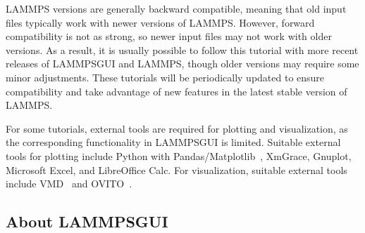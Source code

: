 \documentclass[9pt,tutorial]{livecoms}
\newcommand{\lammpsgui}{\textsf{LAMMPS\textendash GUI}}
\begin{document}
LAMMPS versions are generally backward compatible, meaning that old
input files typically work with newer versions of LAMMPS.  However,
forward compatibility is not as strong, so
newer input files may not work with older versions.  As a result, it is
usually possible to follow this tutorial with more recent releases of
\lammpsgui{} and LAMMPS, though older versions may require some minor adjustments.
These tutorials will be periodically updated to ensure compatibility
and take advantage of new features in the latest stable version of LAMMPS.

For some tutorials, external tools are required for plotting and
visualization, as the corresponding functionality in \lammpsgui{} is
limited.  Suitable external tools for plotting include Python with
Pandas/Matplotlib~\cite{van1995python,hunter2007Matplotlib}, XmGrace,
Gnuplot, Microsoft Excel, and LibreOffice Calc.  For visualization,
suitable external tools include VMD~\cite{vmd_home,humphrey1996vmd}
and OVITO~\cite{ovito_home,ovito_paper}.

\subsection{About \lammpsgui{}}
\end{document}
